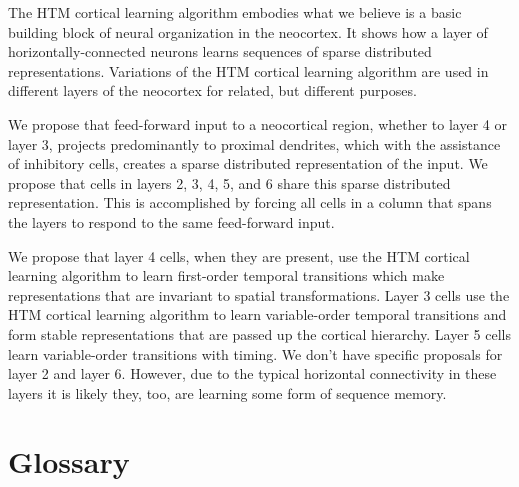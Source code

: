 \documentclass{report}
\begin{document}
The HTM cortical learning algorithm embodies what we believe is a
basic building block of neural organization in the neocortex. It shows
how a layer of horizontally-connected neurons learns sequences of
sparse distributed representations. Variations of the HTM cortical
learning algorithm are used in different layers of the neocortex for
related, but different purposes.

We propose that feed-forward input to a neocortical region, whether to
layer 4 or layer 3, projects predominantly to proximal dendrites,
which with the assistance of inhibitory cells, creates a sparse
distributed representation of the input. We propose that cells in
layers 2, 3, 4, 5, and 6 share this sparse distributed
representation. This is accomplished by forcing all cells in a column
that spans the layers to respond to the same feed-forward input.

We propose that layer 4 cells, when they are present, use the HTM
cortical learning algorithm to learn first-order temporal transitions
which make representations that are invariant to spatial
transformations. Layer 3 cells use the HTM cortical learning algorithm
to learn variable-order temporal transitions and form stable
representations that are passed up the cortical hierarchy. Layer 5
cells learn variable-order transitions with timing. We don't have
specific proposals for layer 2 and layer 6. However, due to the
typical horizontal connectivity in these layers it is likely they,
too, are learning some form of sequence memory.

\chapter*{Glossary}
\label{glossary}
\end{document}
